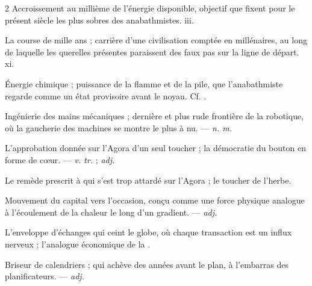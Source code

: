\begin{multicols}{2}
 Accroissement au millième de l'énergie disponible, objectif que fixent pour le présent siècle les plus sobres des anabathmistes.   iii.

 La course de mille ans ; carrière d'une civilisation comptée en millénaires, au long de laquelle les querelles présentes paraissent des faux pas sur la ligne de départ.   xi.

 Énergie chimique ; puissance de la flamme et de la pile, que l'anabathmiste regarde comme un état provisoire avant le noyau. Cf. .

 Ingénierie des mains mécaniques ; dernière et plus rude frontière de la robotique, où la gaucherie des machines se montre le plus à nu. —  \textit{n. m.}

 L'approbation donnée sur l'Agora d'un seul toucher ; la démocratie du bouton en forme de cœur. —  \textit{v. tr.} ;  \textit{adj.}

  Le remède prescrit à qui s'est trop attardé sur l'Agora ; le toucher de l'herbe. 

 Mouvement du capital vers l'occasion, conçu comme une force physique analogue à l'écoulement de la chaleur le long d'un gradient. —  \textit{adj.}

 L'enveloppe d'échanges qui ceint le globe, où chaque transaction est un influx nerveux ; l'analogue économique de la .

 Briseur de calendriers ; qui achève des années avant le plan, à l'embarras des planificateurs. —  \textit{adj.}


\end{multicols}
